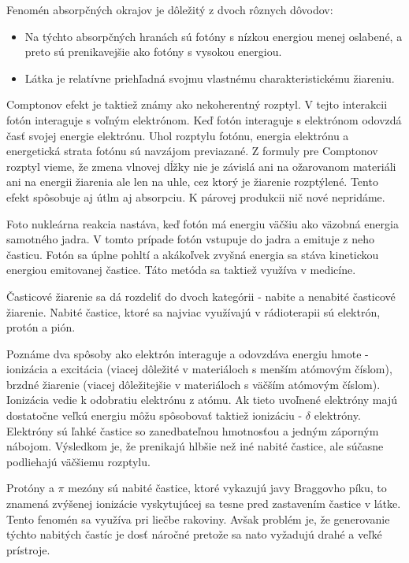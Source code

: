 \documentclass[../../main.tex]{subfiles}
\begin{document}
Fenomén absorpčných okrajov je dôležitý z dvoch rôznych dôvodov:
\begin{itemize}
\item Na týchto absorpčných hranách sú fotóny s nízkou energiou menej oslabené, a preto sú prenikavejšie ako fotóny s vysokou energiou.
\item Látka je relatívne priehľadná svojmu vlastnému charakteristickému žiareniu.
\end{itemize}

Comptonov efekt je taktiež známy ako nekoherentný rozptyl. V tejto interakcii fotón interaguje s voľným elektrónom. Keď fotón interaguje s elektrónom odovzdá časť svojej energie elektrónu. Uhol rozptylu fotónu, energia elektrónu a energetická strata fotónu sú navzájom previazané. Z formuly pre Comptonov rozptyl vieme, že zmena vlnovej dĺžky nie je závislá ani na ožarovanom materiáli ani na energii žiarenia ale len na uhle, cez ktorý je žiarenie rozptýlené. Tento efekt spôsobuje aj útlm aj absorpciu. K párovej produkcii nič nové nepridáme. 

Foto nukleárna reakcia nastáva, keď fotón má energiu väčšiu ako väzobná energia samotného jadra. V tomto prípade fotón vstupuje do jadra a emituje z neho časticu. Fotón sa úplne pohltí a akákoľvek zvyšná energia sa stáva kinetickou energiou emitovanej častice. Táto metóda sa taktiež využíva v medicíne.

Časticové žiarenie sa dá rozdeliť do dvoch kategórii - nabite a nenabité časticové žiarenie. Nabité častice, ktoré sa najviac využívajú v rádioterapii sú elektrón, protón a pión.

Poznáme dva spôsoby ako elektrón interaguje a odovzdáva energiu hmote - ionizácia a excitácia (viacej dôležité v materiáloch s menším atómovým číslom), brzdné žiarenie (viacej dôležitejšie v materiáloch s väčším atómovým číslom). Ionizácia vedie k odobratiu elektrónu z atómu. Ak tieto uvoľnené elektróny majú dostatočne veľkú energiu môžu spôsobovať taktiež ionizáciu - $\delta$ elektróny. Elektróny sú ľahké častice so zanedbateľnou hmotnosťou a jedným záporným nábojom. Výsledkom je, že prenikajú hlbšie než iné nabité častice, ale súčasne podliehajú väčšiemu rozptylu.

Protóny a $\pi$ mezóny sú nabité častice, ktoré vykazujú javy Braggovho píku, to znamená zvýšenej ionizácie vyskytujúcej sa tesne pred zastavením častice v látke. Tento fenomén sa využíva pri liečbe rakoviny. Avšak problém je, že generovanie týchto nabitých častíc je dosť náročné pretože sa nato vyžadujú drahé a veľké prístroje.
\end{document}

